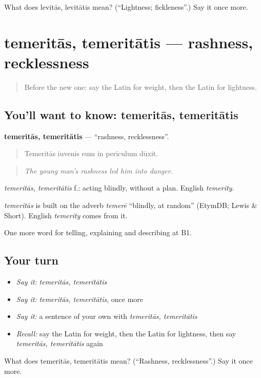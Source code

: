 \begin{tcolorbox}[breakable,colback=teal!4,colframe=teal!35!black,title={Before you move on}]
What does levitās, levitātis mean? (\textquotedblleft{}Lightness; fickleness\textquotedblright{}.) Say it once more.
\end{tcolorbox}
\section[temeritās, temeritātis]{temeritās, temeritātis — rashness, recklessness}

\label{lesson:LA-C370-temeritas}



\begin{quote}
Before the new one: say the Latin for weight, then the Latin for lightness.
\end{quote}

\subsection*{You'll want to know: temeritās, temeritātis}
\textbf{temeritās, temeritātis} — \textquotedblleft{}rashness, recklessness\textquotedblright{}.

\begin{quote}
Temeritās iuvenis eum in perīculum dūxit.
\end{quote}

\begin{quote}
\emph{The young man's rashness led him into danger.}
\end{quote}

\emph{temeritās, temeritātis} f.: acting blindly, without a plan. English \emph{temerity}.

\begin{cousinweb}
\emph{temeritās} is built on the adverb \emph{temerē} \textquotedblleft{}blindly, at random\textquotedblright{} (EtymDB; Lewis \& Short). English \emph{temerity} comes from it.
\end{cousinweb}

\begin{grammarlens}[title={What you've built}]
One more word for telling, explaining and describing at B1.
\end{grammarlens}

\subsection*{Your turn}
\begin{itemize}
\raggedright
  \item \emph{Say it:} \emph{temeritās, temeritātis}
  \item \emph{Say it:} \emph{temeritās, temeritātis}, once more
  \item \emph{Say it:} a sentence of your own with \emph{temeritās, temeritātis}
  \item \emph{Recall:} say the Latin for weight, then the Latin for lightness, then say \emph{temeritās, temeritātis} again
\end{itemize}

\begin{tcolorbox}[breakable,colback=teal!4,colframe=teal!35!black,title={Before you move on}]
What does temeritās, temeritātis mean? (\textquotedblleft{}Rashness, recklessness\textquotedblright{}.) Say it once more.
\end{tcolorbox}
